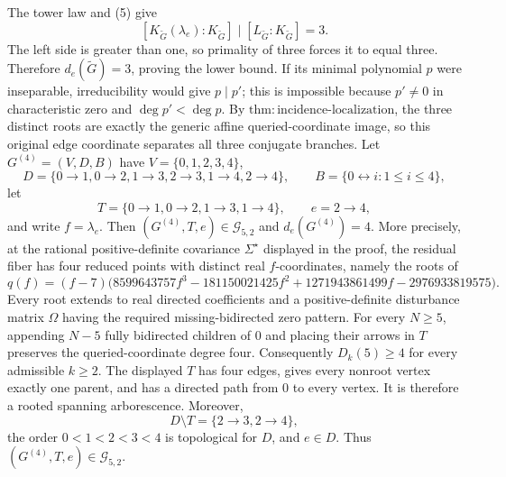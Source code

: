 The tower law and (5) give
\[
 [K_{\widetilde G}(\lambda_e):K_{\widetilde G}]
 \mid [L_{\widetilde G}:K_{\widetilde G}]=3.
\]
The left side is greater than one, so primality of three forces it to equal three. Therefore \(d_e(\widetilde G)=3\), proving the lower bound. If its minimal polynomial \(p\) were inseparable, irreducibility would give \(p\mid p'\); this is impossible because \(p'\neq0\) in characteristic zero and \(\deg p'<\deg p\). By \(\mathrm{thm:incidence\mbox{-}localization}\), the three distinct roots are exactly the generic affine queried-coordinate image, so this original edge coordinate separates all three conjugate branches.
Let \(G^{(4)}=(V,D,B)\) have \(V=\{0,1,2,3,4\}\),
\[
 D=\{0\to1,0\to2,1\to3,2\to3,1\to4,2\to4\},
 \qquad
 B=\{0\leftrightarrow i:1\leq i\leq4\},
\]
let
\[
 T=\{0\to1,0\to2,1\to3,1\to4\},
 \qquad e=2\to4,
\]
and write \(f=\lambda_e\). Then \((G^{(4)},T,e)\in\mathcal G_{5,2}\) and \(d_e(G^{(4)})=4\). More precisely, at the rational positive-definite covariance \(\Sigma^{\star}\) displayed in the proof, the residual fiber has four reduced points with distinct real \(f\)-coordinates, namely the roots of
\[
 q(f)=(f-7)\bigl(8599643757f^3-181150021425f^2
 +1271943861499f-2976933819575\bigr).
\]
Every root extends to real directed coefficients and a positive-definite disturbance matrix \(\Omega\) having the required missing-bidirected zero pattern. For every \(N\geq5\), appending \(N-5\) fully bidirected children of \(0\) and placing their arrows in \(T\) preserves the queried-coordinate degree four. Consequently \(D_k(5)\geq4\) for every admissible \(k\geq2\).
The displayed \(T\) has four edges, gives every nonroot vertex exactly one parent, and has a directed path from \(0\) to every vertex. It is therefore a rooted spanning arborescence. Moreover,
\[
 D\setminus T=\{2\to3,2\to4\},
\]
the order \(0<1<2<3<4\) is topological for \(D\), and \(e\in D\). Thus \((G^{(4)},T,e)\in\mathcal G_{5,2}\).

